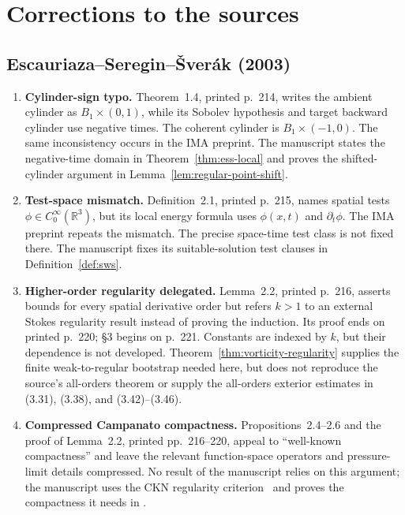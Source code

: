 \documentclass[11pt,letterpaper]{article}
\numberwithin{equation}{section}
\theoremstyle{plain}
\theoremstyle{definition}
\theoremstyle{remark}
\begin{document}
\appendix
\section{Corrections to the sources}\label{app:errata}

\subsection*{Escauriaza--Seregin--Šverák (2003)}

\begin{enumerate}
\item \textbf{Cylinder-sign typo.} Theorem~1.4, printed p.~214, writes the ambient cylinder as \(B_1\times(0,1)\), while its Sobolev hypothesis and target backward cylinder use negative times. The coherent cylinder is \(B_1\times(-1,0)\). The same inconsistency occurs in the IMA preprint. The manuscript states the negative-time domain in Theorem~\ref{thm:ess-local} and proves the shifted-cylinder argument in Lemma~\ref{lem:regular-point-shift}.

\item \textbf{Test-space mismatch.} Definition~2.1, printed p.~215, names spatial tests \(\phi\in C^\infty_0(\mathbb R^3)\), but its local energy formula uses \(\phi(x,t)\) and \(\partial_t\phi\). The IMA preprint repeats the mismatch. The precise space-time test class is not fixed there. The manuscript fixes its suitable-solution test clauses in Definition~\ref{def:sws}.

\item \textbf{Higher-order regularity delegated.} Lemma~2.2, printed p.~216, asserts bounds for every spatial derivative order but refers \(k>1\) to an external Stokes regularity result instead of proving the induction. Its proof ends on printed p.~220; §3 begins on p.~221. Constants are indexed by \(k\), but their dependence is not developed. Theorem~\ref{thm:vorticity-regularity} supplies the finite weak-to-regular bootstrap needed here, but does not reproduce the source's all-orders theorem or supply the all-orders exterior estimates in (3.31), (3.38), and (3.42)--(3.46).

\item \textbf{Compressed Campanato compactness.} Propositions~2.4--2.6 and the proof of Lemma~2.2, printed pp.~216--220, appeal to “well-known compactness” and leave the relevant function-space operators and pressure-limit details compressed. No result of the manuscript relies on this argument; the manuscript uses the CKN regularity criterion~\cite{CKNLean} and proves the compactness it needs in \cite[Lemma~11.1]{CKNLean}.


\end{enumerate}
\end{document}
